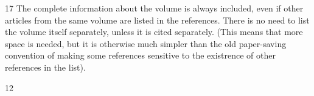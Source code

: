  	
 	
 	
 	
 	
 	
 	
 	
 	
 	
 	
 	
 	
 	
 	
 	
 	
 	
 	
 	
 	
 	
 	
 	
 	
 	
 	
 	
 	
 	
 	
 	
 	
 	
 	
 	
 	
 	
 	
 	
 	
 	
 	
 	
 	
 	
 	
 	
 	
 	
 	
 	
 	
 	
	
 
17
The complete information about the volume is always included, even if other articles from the same volume
are listed in the references. There is no need to list the volume itself separately, unless it is cited separately.
(This means that more space is needed, but it is otherwise much simpler than the old paper-saving
convention of making some references sensitive to the existrence of other references in the list).
	
 
 12	
  
